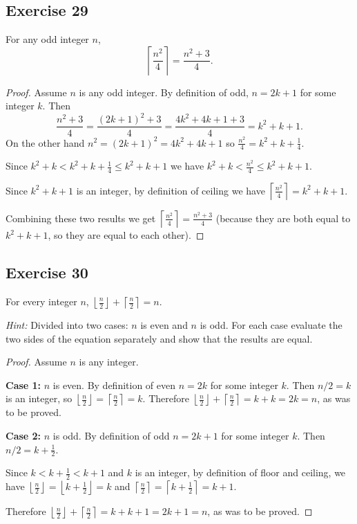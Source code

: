 \documentclass[14pt]{extarticle}
\newcommand{\dps}{\displaystyle}
\newcommand{\floor}[1]{{\left\lfloor#1\right\rfloor}}
\newcommand{\ceil}[1]{{\left\lceil#1\right\rceil}}
\begin{document}
\subsection{Exercise 29}
For any odd integer $n$,
\[
\ceil{\frac{n^2}{4}} = \frac{n^2+3}{4}.
\]
\begin{proof}
Assume $n$ is any odd integer. By definition of odd, $n = 2k+1$ for some integer $k$. Then
\[
\frac{n^2+3}{4} = \frac{(2k+1)^2+3}{4} = \frac{4k^2 + 4k + 1+3}{4} = k^2+k+1.
\]
On the other hand $n^2 = (2k+1)^2 = 4k^2+4k+1$ so $\frac{n^2}{4} = k^2+k+\frac{1}{4}$. 

Since $k^2+k < k^2+k+\frac{1}{4} \leq k^2+k+1$ we have $k^2+k < \frac{n^2}{4} \leq k^2+k+1$. 

Since $k^2+k+1$ is an integer, by definition of ceiling we have $\dps\ceil{\frac{n^2}{4}} = k^2+k+1$.

Combining these two results we get $\dps\ceil{\frac{n^2}{4}} = \frac{n^2+3}{4}$ (because they are both equal to $k^2+k+1$, so they are equal to each other).
\end{proof}

\subsection{Exercise 30}
For every integer $n$, $\dps \floor{\frac{n}{2}} + \ceil{\frac{n}{2}} = n$.

{\it Hint:} Divided into two cases: $n$ is even and $n$ is odd. For each case evaluate the two sides of the equation
separately and show that the results are equal.

\begin{proof}
Assume $n$ is any integer.

{\bf Case 1:} $n$ is even. By definition of even $n = 2k$ for some integer $k$. Then $n/2 = k$ is an integer, so $\floor{\frac{n}{2}} = \ceil{\frac{n}{2}} = k$. Therefore $\floor{\frac{n}{2}} + \ceil{\frac{n}{2}} = k + k = 2k = n$, as was to be proved.

{\bf Case 2:} $n$ is odd. By definition of odd $n = 2k+1$ for some integer $k$. Then $n/2 = k+\frac{1}{2}$.

Since $k < k+\frac{1}{2} < k+1$ and $k$ is an integer, by definition of floor and ceiling, we have $\floor{\frac{n}{2}} = \floor{k+\frac{1}{2}} = k$ and $\ceil{\frac{n}{2}} = \ceil{k+\frac{1}{2}} = k+1$.

Therefore $\floor{\frac{n}{2}} + \ceil{\frac{n}{2}} = k + k + 1 = 2k+1 = n$, as was to be proved.
\end{proof}
\end{document}
